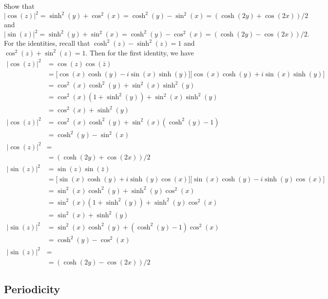 \begin{enumerate}
  Show that
  \[
  \lvert\cos(z)\rvert^2 = \sinh^2(y) + \cos^2(x) = \cosh^2(y) - \sin^2(x) =
  (\cosh(2y) + \cos(2x))/2
  \]
  and
  \[
  \lvert\sin(z)\rvert^2 = \sinh^2(y) + \sin^2(x) = \cosh^2(y) - \cos^2(x) =
  (\cosh(2y) - \cos(2x))/2.
  \]
  For the identities, recall that \(\cosh^2(z) - \sinh^2(z) = 1\) and
  \(\cos^2(z) + \sin^2(z) = 1\).
  Then for the first identity, we have
  \begin{align*}
    \lvert\cos(z)\rvert^2 & = \cos(z)\cos(\bar{z})\\
                          & = \bigl[\cos(x)\cosh(y) - i\sin(x)\sinh(y)\bigr]
                            \bigl[\cos(x)\cosh(y) + i\sin(x)\sinh(y)\bigr]\\
                          & = \cos^2(x)\cosh^2(y) + \sin^2(x)\sinh^2(y)\\
                          & = \cos^2(x)(1 + \sinh^2(y)) + \sin^2(x)\sinh^2(y)\\
                          & = \cos^2(x) + \sinh^2(y)\\
    \lvert\cos(z)\rvert^2 & = \cos^2(x)\cosh^2(y) + \sin^2(x)(\cosh^2(y) - 1)\\
                          & = \cosh^2(y) - \sin^2(x)\\
    \lvert\cos(z)\rvert^2 & = \\
                          & = (\cosh(2y) + \cos(2x))/2\\
    \lvert\sin(z)\rvert^2 & = \sin(z)\sin(\bar{z})\\
                          & = \bigl[\sin(x)\cosh(y) + i\sinh(y)\cos(x)\bigr]
                            \bigl[\sin(x)\cosh(y) - i\sinh(y)\cos(x)\bigr]\\
                          & = \sin^2(x)\cosh^2(y) + \sinh^2(y)\cos^2(x)\\
                          & = \sin^2(x)(1 + \sinh^2(y)) + \sinh^2(y)\cos^2(x)\\
                          & = \sin^2(x) + \sinh^2(y)\\
    \lvert\sin(z)\rvert^2 & = \sin^2(x)\cosh^2(y) + (\cosh^2(y) - 1)\cos^2(x)\\
                          & = \cosh^2(y) - \cos^2(x)\\
    \lvert\sin(z)\rvert^2 & = \\
                          & = (\cosh(2y) - \cos(2x))/2
  \end{align*}
\end{enumerate}

\subsection{Periodicity}

